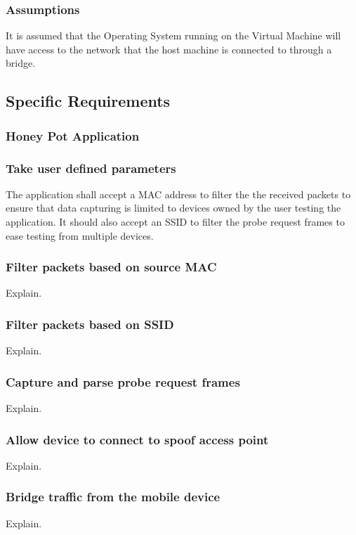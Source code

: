 \subsubsection{Assumptions}
It is assumed that the Operating System running on the Virtual Machine will have access to the network that the host machine is connected to through a bridge.

\subsection{Specific Requirements}
\subsubsection{Honey Pot Application}
\subsubsection*{Take user defined parameters}

The application shall accept a MAC address to filter the the received packets to ensure that data capturing is limited to devices owned by the user testing the application. It should also accept an SSID to filter the probe request frames to ease testing from multiple devices.
 
\subsubsection*{Filter packets based on source MAC}
Explain.

\subsubsection*{Filter packets based on SSID}
Explain.

\subsubsection*{Capture and parse probe request frames}
Explain.

\subsubsection*{Allow device to connect to spoof access point}
Explain.

\subsubsection*{Bridge traffic from the mobile device}
Explain.


